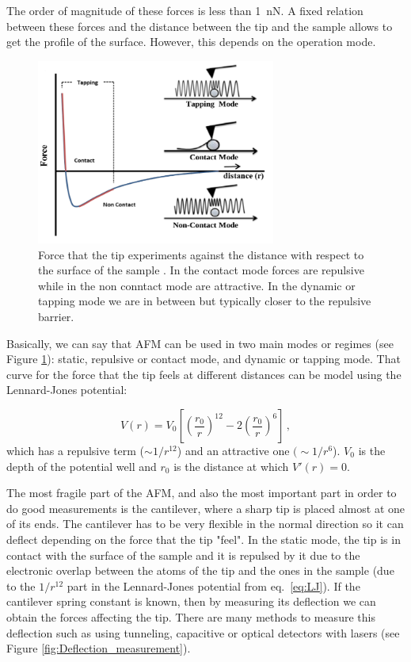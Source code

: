 \documentclass[11pt,a4paper]{article}
\begin{document}
The order of magnitude of these forces is less than \SI{1}{\nano\N}. A fixed relation between these forces and the distance between the tip and the sample allows to get the profile of the surface. However, this depends on the operation mode.

\begin{figure}[ht]
\centering
\includegraphics[width=0.7\textwidth]{AFM_modes}
\caption{Force that the tip experiments against the distance with respect to the surface of the sample \cite{jfb8010007}. In the contact mode forces are repulsive while in the non conntact mode are attractive. In the dynamic or tapping mode we are in between but typically closer to the repulsive barrier.}
\label{fig:AFM_modes}
\end{figure}

Basically, we can say that AFM can be used in two main modes or regimes (see Figure \ref{fig:AFM_modes}): static, repulsive or contact mode, and dynamic or tapping mode. That curve for the force that the tip feels at different distances can be model using the Lennard-Jones potential:

\begin{equation}\label{eq:LJ}
V(r)=V_0\left[\left(\frac{r_0}{r}\right)^{12}-2\left(\frac{r_0}{r}\right)^6\right]\,,
\end{equation}
which has a repulsive term ($\sim1/r^{12}$) and an attractive one $(\sim1/r^6$). $V_0$ is the depth of the potential well and $r_0$ is the distance at which $V'(r)=0$.

The most fragile part of the AFM, and also the most important part in order to do good measurements is the cantilever, where a sharp tip is placed almost at one of its ends. The cantilever has to be very flexible in the normal direction so it can deflect depending on the force that the tip "feel". In the static mode, the tip is in contact with the surface of the sample and it is repulsed by it due to the electronic overlap between the atoms of the tip and the ones in the sample (due to the $1/r^{12}$ part in the Lennard-Jones potential from eq.~\eqref{eq:LJ}). If the cantilever spring constant is known, then by measuring its deflection we can obtain the forces affecting the tip. There are many methods to measure this deflection such as using tunneling, capacitive or optical detectors with lasers (see Figure \ref{fig:Deflection_measurement}).
\end{document}
